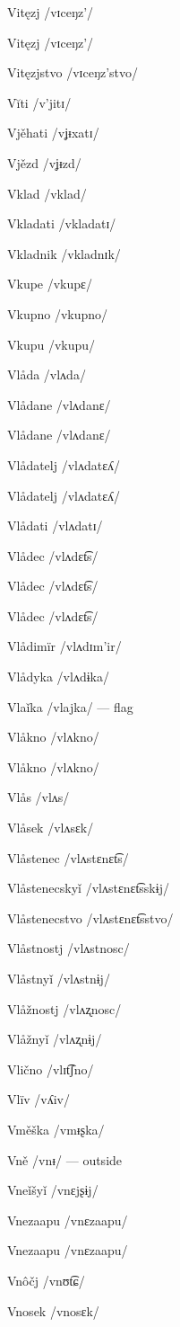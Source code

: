 Vitęzj /vɪceŋz’/

Vitęzj /vɪceŋz’/

Vitęzjstvo /vɪceŋz’stvo/

Vĭti /v’jitɪ/

Vjěhati /vʝᵻxatɪ/

Vjězd /vʝᵻzd/

Vklad /vklad/

Vkladati /vkladatɪ/

Vkladnik /vkladnɪk/

Vkupe /vkupɛ/

Vkupno /vkupno/

Vkupu /vkupu/

Vlåda /vlʌda/

Vlådane /vlʌdanɛ/

Vlådane /vlʌdanɛ/

Vlådatelj /vlʌdatɛʎ/

Vlådatelj /vlʌdatɛʎ/

Vlådati /vlʌdatɪ/

Vlådec /vlʌdɛt͡s/

Vlådec /vlʌdɛt͡s/

Vlådec /vlʌdɛt͡s/

Vlådimïr /vlʌdɪm’ir/

Vlådyka /vlʌdɨka/

Vlaǐka /vlajka/ — flag

Vlåkno /vlʌkno/

Vlåkno /vlʌkno/

Vlås /vlʌs/

Vlåsek /vlʌsɛk/

Vlåstenec /vlʌstɛnɛt͡s/

Vlåstenecskyǐ /vlʌstɛnɛt͡sskɨj/

Vlåstenecstvo /vlʌstɛnɛt͡sstvo/

Vlåstnostj /vlʌstnosc/

Vlåstnyǐ /vlʌstnɨj/

Vlåžnostj /vlʌʐnosc/

Vlåžnyǐ /vlʌʐnɨj/

Vlično /vlɪt͡ʃno/

Vlïv /vʎiv/

Vměška /vmᵻʂka/

Vně /vnᵻ/ — outside

Vneǐšyǐ /vnɛjʂɨj/

Vnezaapu /vnɛzaapu/

Vnezaapu /vnɛzaapu/

Vnôčj /vnʊt͡ɕ/

Vnosek /vnosɛk/

